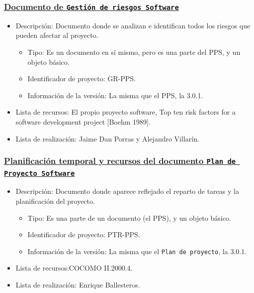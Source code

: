 \documentclass[spanish,a4paper,11pt, twoside]{report}	%
\begin{document}
			\subsubsection{\underline{Documento de \texttt{Gestión de riesgos Software}}}
			\begin{itemize}	
				\item{Descripción:} Documento donde se analizan e identifican todos los riesgos que pueden afectar al proyecto.
					\begin{itemize}	
						\item{Tipo:} Es un documento en sí mismo, pero es una parte del PPS, y un objeto básico.
						\item{Identificador de proyecto:} GR-PPS.
						\item{Información de la versión:} La misma que el PPS, la 3.0.1.
					\end{itemize}	
				\item{Lista de recursos:} El propio proyecto software, Top ten risk factors for a software development project [Boehm 1989].
				\item{Lista de realización:} Jaime Dan Porras y Alejandro Villarín.
			\end{itemize}		

			\subsubsection{\underline{Planificación temporal y recursos del documento \texttt{Plan de Proyecto Software}}}
			\begin{itemize}	
				\item{Descripción:} Documento donde aparece reflejado el reparto de tareas y la planificación del proyecto.
					\begin{itemize}	
						\item{Tipo:} Es una parte de un documento (el PPS), y un objeto básico.
						\item{Identificador de proyecto:} PTR-PPS.
						\item{Información de la versión:} La misma que el \texttt{Plan de proyecto}, la 3.0.1.
					\end{itemize}	
				\item{Lista de recursos:}COCOMO II.2000.4.
				\item{Lista de realización:} Enrique Ballesteros.
			\end{itemize}	
\end{document}
